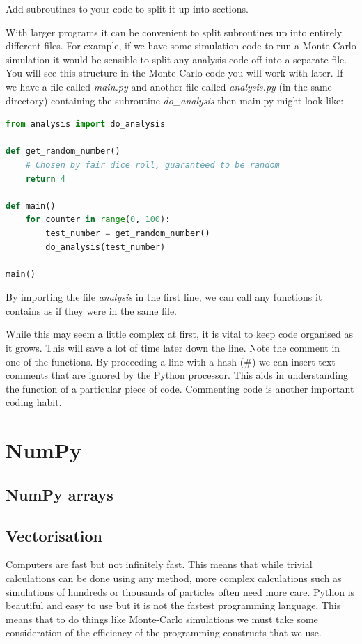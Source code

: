 			\begin{task}Add subroutines to your code to split it up into sections.\end{task}

			With larger programs it can be convenient to split subroutines up into entirely different files. For example, if we have some simulation code to run a Monte Carlo simulation it would be sensible to split any analysis code off into a separate file. You will see this structure in the Monte Carlo code you will work with later. If we have a file called \textit{main.py} and another file called \textit{analysis.py} (in the same directory) containing the subroutine \textit{do\_analysis} then main.py might look like:
\begin{lstlisting}[language=Python]
from analysis import do_analysis

def get_random_number()
	# Chosen by fair dice roll, guaranteed to be random
	return 4
	
def main()
	for counter in range(0, 100):
		test_number = get_random_number()
		do_analysis(test_number)
			
main()\end{lstlisting}
By importing the file \textit{analysis} in the first line, we can call any functions it contains as if they were in the same file.

While this may seem a little complex at first, it is vital to keep code organised as it grows. This will save a lot of time later down the line. Note the comment in one of the functions. By proceeding a line with a hash (\#) we can insert text comments that are ignored by the Python processor. This aids in understanding the function of a particular piece of code. Commenting code is another important coding habit. 


\section{NumPy}
	\subsection{NumPy arrays}

	\subsection{Vectorisation}
	Computers are fast but not infinitely fast. This means that while trivial calculations can be done using any method, more complex calculations such as simulations of hundreds or thousands of particles often need more care. Python is beautiful and easy to use but it is not the fastest programming language. This means that to do things like Monte-Carlo simulations we must take some consideration of the efficiency of the programming constructs that we use.

